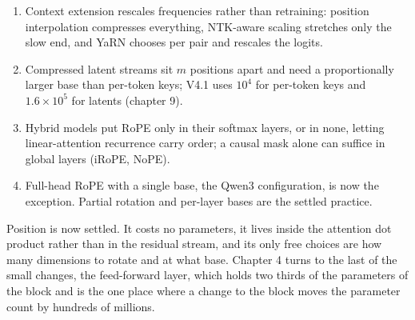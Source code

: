 \begin{enumerate}
  head width.
\item
  Context extension rescales frequencies rather than retraining:
  position interpolation compresses everything, NTK-aware scaling
  stretches only the slow end, and YaRN chooses per pair and rescales
  the logits.
\item
  Compressed latent streams sit \(m\) positions apart and need a
  proportionally larger base than per-token keys; V4.1 uses \(10^4\) for
  per-token keys and \(1.6 \times 10^5\) for latents (chapter 9).
\item
  Hybrid models put RoPE only in their softmax layers, or in none,
  letting linear-attention recurrence carry order; a causal mask alone
  can suffice in global layers (iRoPE, NoPE).
\item
  Full-head RoPE with a single base, the Qwen3 configuration, is now the
  exception. Partial rotation and per-layer bases are the settled
  practice.
\end{enumerate}

Position is now settled. It costs no parameters, it lives inside the
attention dot product rather than in the residual stream, and its only
free choices are how many dimensions to rotate and at what base. Chapter
4 turns to the last of the small changes, the feed-forward layer, which
holds two thirds of the parameters of the block and is the one place
where a change to the block moves the parameter count by hundreds of
millions.

